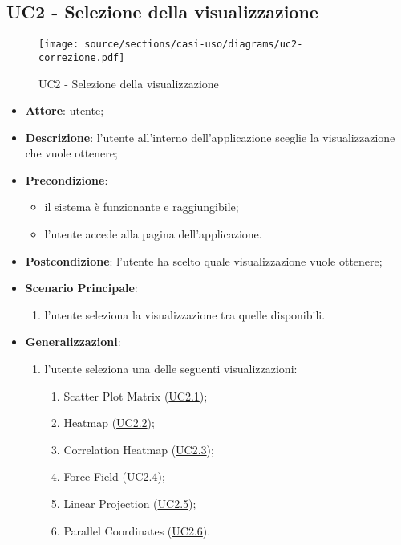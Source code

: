 \subsection{UC2 - Selezione della visualizzazione}
\label{uc2}

    \begin{figure}[htbp]
        \centering
        \texttt{[image: source/sections/casi-uso/diagrams/uc2-correzione.pdf]}
        \caption{UC2 - Selezione della visualizzazione}
        \label{fig:uc2}
    \end{figure}

    \begin{itemize}
    \item \textbf{Attore}: utente;
    \item \textbf{Descrizione}: l'utente all'interno dell'applicazione sceglie la visualizzazione che vuole ottenere;
    \item \textbf{Precondizione}:
    \begin{itemize}
        \item il sistema è funzionante e raggiungibile;
        \item l'utente accede alla pagina dell'applicazione.
    \end{itemize}
    \item \textbf{Postcondizione}: l'utente ha scelto quale visualizzazione vuole ottenere;
    \item \textbf{Scenario Principale}: 
        \begin{enumerate}
            \item l'utente seleziona la visualizzazione tra quelle disponibili.
        \end{enumerate}  
    \item \textbf{Generalizzazioni}:
        \begin{enumerate}
            \item l'utente seleziona una delle seguenti visualizzazioni:
                \begin{enumerate}
                    \item Scatter Plot Matrix (\hyperref[uc2.1]{UC2.1});
                    \item Heatmap (\hyperref[uc2.2]{UC2.2});
                    \item Correlation Heatmap (\hyperref[uc2.3]{UC2.3});
                    \item Force Field (\hyperref[uc2.4]{UC2.4});
                    \item Linear Projection (\hyperref[uc2.5]{UC2.5});
                    \item Parallel Coordinates (\hyperref[uc2.6]{UC2.6}).
                \end{enumerate}
        \end{enumerate}  
    \end{itemize}
    
